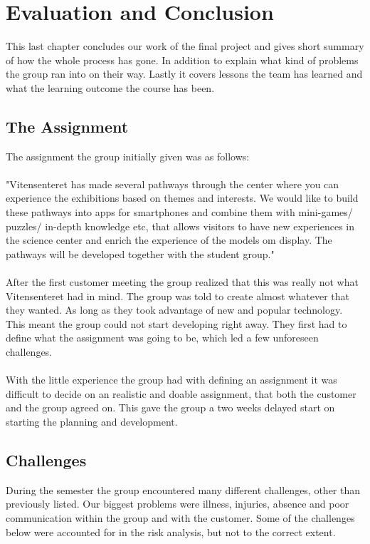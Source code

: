 \chapter{Evaluation and Conclusion}
This last chapter concludes our work of the final project and gives short summary of how the whole process has gone. In addition to explain what kind of problems the group ran into on their way. Lastly it covers lessons the team has learned and what the learning outcome the course has been. 

\section{The Assignment}
The assignment the group initially given was as follows:\\
\\
"Vitensenteret has made several pathways through the center where you can experience the exhibitions based on themes and interests. We would like to build these pathways into apps for smartphones and combine them with mini-games/ puzzles/ in-depth knowledge etc, that allows visitors to have new experiences in the science center and enrich the experience of the models om display. The pathways will be developed together with the student group."\\
\\
After the first customer meeting the group realized that this was really not what Vitensenteret had in mind. The group was told to create almost whatever that they wanted. As long as they took advantage of new and popular technology. This meant the group could not start developing right away. They first had to define what the assignment was going to be, which led a few unforeseen challenges.\\
\\
With the little experience the group had with defining an assignment it was difficult to decide on an realistic and doable assignment, that both the customer and the group agreed on. This gave the group a two weeks delayed start on starting the planning and development.

\section{Challenges}
During the semester the group encountered many different challenges, other than previously listed. Our biggest problems were illness, injuries, absence and poor communication within the group and with the customer. Some of the challenges below were accounted for in the risk analysis, but not to the correct extent.

